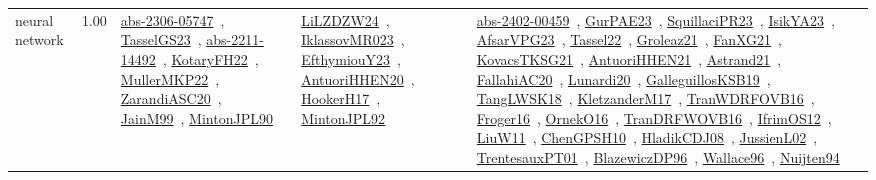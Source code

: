 {\begin{longtable}{p{3cm}r>{\raggedright\arraybackslash}p{6cm}>{\raggedright\arraybackslash}p{6cm}>{\raggedright\arraybackslash}p{8cm}}
\index{neural network}\index{Algorithms!neural network}neural network &  1.00 & \href{../works/abs-2306-05747.pdf}{abs-2306-05747}~\cite{abs-2306-05747}, \href{../works/TasselGS23.pdf}{TasselGS23}~\cite{TasselGS23}, \href{../works/abs-2211-14492.pdf}{abs-2211-14492}~\cite{abs-2211-14492}, \href{../works/KotaryFH22.pdf}{KotaryFH22}~\cite{KotaryFH22}, \href{../works/MullerMKP22.pdf}{MullerMKP22}~\cite{MullerMKP22}, \href{../works/ZarandiASC20.pdf}{ZarandiASC20}~\cite{ZarandiASC20}, \href{../works/JainM99.pdf}{JainM99}~\cite{JainM99}, \href{../works/MintonJPL90.pdf}{MintonJPL90}~\cite{MintonJPL90} & \href{../works/LiLZDZW24.pdf}{LiLZDZW24}~\cite{LiLZDZW24}, \href{../works/IklassovMR023.pdf}{IklassovMR023}~\cite{IklassovMR023}, \href{../works/EfthymiouY23.pdf}{EfthymiouY23}~\cite{EfthymiouY23}, \href{../works/AntuoriHHEN20.pdf}{AntuoriHHEN20}~\cite{AntuoriHHEN20}, \href{../works/HookerH17.pdf}{HookerH17}~\cite{HookerH17}, \href{../works/MintonJPL92.pdf}{MintonJPL92}~\cite{MintonJPL92} & \href{../works/abs-2402-00459.pdf}{abs-2402-00459}~\cite{abs-2402-00459}, \href{../works/GurPAE23.pdf}{GurPAE23}~\cite{GurPAE23}, \href{../works/SquillaciPR23.pdf}{SquillaciPR23}~\cite{SquillaciPR23}, \href{../works/IsikYA23.pdf}{IsikYA23}~\cite{IsikYA23}, \href{../works/AfsarVPG23.pdf}{AfsarVPG23}~\cite{AfsarVPG23}, \href{../works/Tassel22.pdf}{Tassel22}~\cite{Tassel22}, \href{../works/Groleaz21.pdf}{Groleaz21}~\cite{Groleaz21}, \href{../works/FanXG21.pdf}{FanXG21}~\cite{FanXG21}, \href{../works/KovacsTKSG21.pdf}{KovacsTKSG21}~\cite{KovacsTKSG21}, \href{../works/AntuoriHHEN21.pdf}{AntuoriHHEN21}~\cite{AntuoriHHEN21}, \href{../works/Astrand21.pdf}{Astrand21}~\cite{Astrand21}, \href{../works/FallahiAC20.pdf}{FallahiAC20}~\cite{FallahiAC20}, \href{../works/Lunardi20.pdf}{Lunardi20}~\cite{Lunardi20}, \href{../works/GalleguillosKSB19.pdf}{GalleguillosKSB19}~\cite{GalleguillosKSB19}, \href{../works/TangLWSK18.pdf}{TangLWSK18}~\cite{TangLWSK18}, \href{../works/KletzanderM17.pdf}{KletzanderM17}~\cite{KletzanderM17}, \href{../works/TranWDRFOVB16.pdf}{TranWDRFOVB16}~\cite{TranWDRFOVB16}, \href{../works/Froger16.pdf}{Froger16}~\cite{Froger16}, \href{../works/OrnekO16.pdf}{OrnekO16}~\cite{OrnekO16}, \href{../works/TranDRFWOVB16.pdf}{TranDRFWOVB16}~\cite{TranDRFWOVB16}, \href{../works/IfrimOS12.pdf}{IfrimOS12}~\cite{IfrimOS12}, \href{../works/LiuW11.pdf}{LiuW11}~\cite{LiuW11}, \href{../works/ChenGPSH10.pdf}{ChenGPSH10}~\cite{ChenGPSH10}, \href{../works/HladikCDJ08.pdf}{HladikCDJ08}~\cite{HladikCDJ08}, \href{../works/JussienL02.pdf}{JussienL02}~\cite{JussienL02}, \href{../works/TrentesauxPT01.pdf}{TrentesauxPT01}~\cite{TrentesauxPT01}, \href{../works/BlazewiczDP96.pdf}{BlazewiczDP96}~\cite{BlazewiczDP96}, \href{../works/Wallace96.pdf}{Wallace96}~\cite{Wallace96}, \href{../works/Nuijten94.pdf}{Nuijten94}~\cite{Nuijten94}\\

\end{longtable}}
